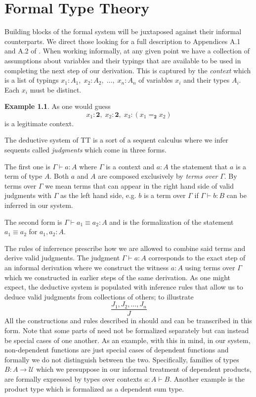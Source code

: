 \documentclass[12pt]{report}
\theoremstyle{definition}
\newtheorem{exmp}[thm]{Example}
\begin{document}
\chapter{Formal Type Theory}\label{formalTT}
Building blocks of the formal system will be juxtaposed against their informal counterparts. 
We direct those looking for a full description to Appendices A.1 and A.2 of \cite{hottbook}. 
When working informally, at any given point we have a collection of assumptions about variables and their typings that are available to be used in completing the next step of our derivation. 
This is captured by the \textit{context} which is a list of typings $x_1 : A_1,\; x_2 : A_2,\;\ldots,\;x_n : A_n$ of variables $x_i$ and their types $A_i$. 
Each $x_i$ must be distinct. 
\begin{exmp}
As one would guess
$$x_1 : \mathbf{2},\; x_2 : \mathbf{2},\; x_3 : (x_1=_\mathbf{2} x_2)$$
is a legitimate context. 
\end{exmp}

The deductive system of TT is a sort of a sequent calculus where we infer sequents called \textit{judgments} which come in three forms.

The first one is $\Gamma \vdash a : A$ where $\Gamma$ is a context and $a : A$ the statement that $a$ is a term of type $A$. 
Both $a$ and $A$ are composed exclusively by \textit{terms over} $\Gamma$. 
By terms over $\Gamma$ we mean terms that can appear in the right hand side of valid judgments with $\Gamma$ as the left hand side, e.g. $b$ is a term over $\Gamma$ if $\Gamma \vdash b : B$ can be inferred in our system. 

The second form is $\Gamma \vdash a_1 \equiv a_2 : A$ and is the formalization of the statement $a_1 \equiv a_2$ for $a_1, a_2 : A$. 

The rules of inferrence prescribe how we are allowed to combine said terms and derive valid judgments. 
The judgment $\Gamma \vdash a  : A$ corresponds to the exact step of an informal derivation where we construct the witness $a : A$ using terms over $\Gamma$ which we constructed in earlier steps of the same derivation. 
As one might expect, the deductive system is populated with inference rules that allow us to deduce valid judgments from collections of others; to illustrate
$$\frac{J_1,J_2,\ldots,J_n}{J}$$
All the constructions and rules described in  should and can be transcribed in this form. 
Note that some parts of  need not be formalized separately but can instead be special cases of one another. 
As an example, with this in mind, in our system, non-dependent functions are just special cases of dependent functions and formally we do not distinguish between the two. 
Specifically, families of types $B : A\rightarrow \mathcal{U}$ which we presuppose in our informal treatment of dependent products, are formally expressed by types over contexts $a : A \vdash B$. 
Another example is the product type which is formalized as a dependent sum type. 
\end{document}
